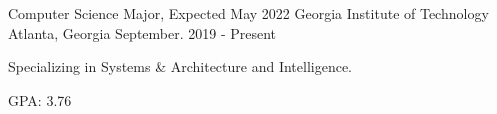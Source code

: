 \begin{cventries}
    
\cventry
    {Computer Science Major, Expected May 2022}
    {Georgia Institute of Technology}
    {Atlanta, Georgia}
    {September. 2019 - Present}
    {
      \begin{cvitems}
        \item {Specializing in Systems \& Architecture and Intelligence.}
        \item {GPA: 3.76}
      \end{cvitems}
    }





\end{cventries}
